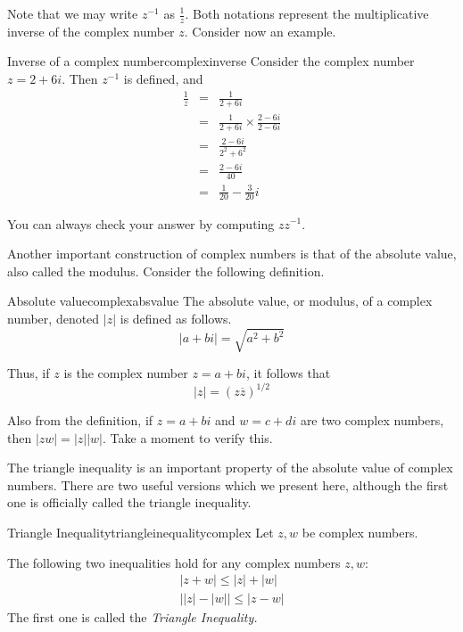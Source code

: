 Note that we may write $z^{-1}$ as $\frac{1}{z}$. Both notations represent the multiplicative inverse of the complex number $z$. Consider now an example.

\begin{example}{Inverse of a complex number}{complexinverse}
Consider the complex number $z = 2 + 6i$. Then $z^{-1}$ is defined, and
\begin{eqnarray*}
 \frac{1}{z} &=& \frac{1}{2+6i}\\
 &=& \frac{1}{2+6i}\times \frac{2-6i}{2-6i} \\
 &=& \frac{2-6i}{2^2+6^2} \\
 &=& \frac{2-6i}{40} \\
 &=& \frac{1}{20} -  \frac{3}{20}i
\end{eqnarray*}

You can always check your answer by computing $zz^{-1}$.
\end{example}

Another important construction of complex numbers is that of the absolute value, also called the modulus. Consider the following definition. 

\begin{definition}{Absolute value}{complexabsvalue}
%
The absolute
value, or modulus, of a complex number, denoted $\left| z \right|$ is defined as follows.
\begin{equation*}
\left| a+bi\right| =
\sqrt{a^{2}+b^{2}}
\end{equation*}
\end{definition}

Thus, if $z$ is the complex number $z=a+bi$, it follows that
\begin{equation*}
\left| z\right| =\left( z\overline{z}\right) ^{1/2}
\end{equation*}

Also from the definition, if $z=a+bi$ and $w=c+di$ are two complex numbers,
then $\left\vert zw\right\vert =\left\vert z\right\vert \left\vert
w\right\vert .$ Take a moment to verify this.

The triangle inequality is an important property of the absolute value
of complex numbers. There are two useful versions which we present
here, although the first one is officially called the triangle inequality. 

\begin{proposition}{Triangle Inequality}{triangleinequalitycomplex}
Let $z,w$ be complex numbers. 

The following two inequalities hold for any  complex numbers $z,w$:
\begin{equation*}
\begin{array}{l}
\left| z+w\right| \leq \left| z\right| +\left| w\right|  \\
\left| \left| z\right| -\left| w\right| \right| \leq \left| z-w\right| 
\end{array}
\end{equation*}
The first one is called the \em{Triangle Inequality}.
\end{proposition}

